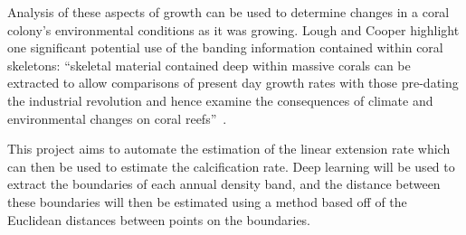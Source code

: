 Analysis of these aspects of growth can be used to determine changes in a coral colony's environmental conditions as it was growing. Lough and Cooper highlight one significant potential use of the banding information contained within coral skeletons: ``skeletal material contained deep within massive corals can be extracted to allow comparisons of present day growth rates with those pre-dating the industrial revolution and hence examine the consequences of climate and environmental changes on coral reefs''~\cite{lough2011new}.

This project aims to automate the estimation of the linear extension rate which can then be used to estimate the calcification rate. Deep learning will be used to extract the boundaries of each annual density band, and the distance between these boundaries will then be estimated using a method based off of the Euclidean distances between points on the boundaries.

